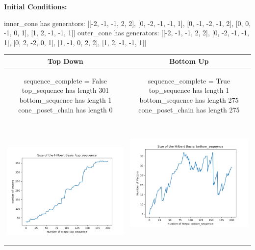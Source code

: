\documentclass[10pt]{article}
\begin{document}
\textbf{Initial Conditions:}
\begin{SAGE}
inner_cone has generators: 
[[-2, -1, -1, 2, 2], [0, -2, -1, -1, 1], [0, -1, -2, -1, 2], [0, 0, -1, 0, 1], [1, 2, -1, -1, 1]]
outer_cone has generators: 
[[-2, -1, -1, 2, 2], [0, -2, -1, -1, 1], [0, 2, -2, 0, 1], [1, -1, 0, 2, 2], [1, 2, -1, -1, 1]]

\end{SAGE}
\begin{tabular}{c|c}
\textbf{Top Down} & \textbf{Bottom Up} \\ \hline  
\begin{SAGE}
	sequence_complete = False
	top_sequence has length 301
	bottom_sequence has length 1
	cone_poset_chain has length 0
\end{SAGE} 
&
\begin{SAGE}
	sequence_complete = True
	top_sequence has length 1
	bottom_sequence has length 275
	cone_poset_chain has length 275
\end{SAGE} 
\\ \hline
\
\begin{minipage}{.45\textwidth}
\includegraphics[width=\textwidth]{"DATA/5d/5 generators 2 bound E/top_sequence SIZE"}
\end{minipage} &
\begin{minipage}{.45\textwidth}
\includegraphics[width=\textwidth]{"DATA/5d/5 generators 2 bound E bottomup/bottom_sequence SIZE"}

\end{minipage}
\end{tabular}
\end{document}
